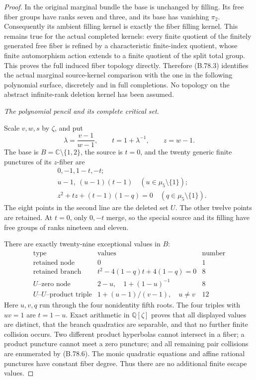 \begin{proof}
In the original marginal bundle the base is unchanged by filling.
Its free fiber groups have ranks seven and three, and its base has
vanishing \(\pi _2\). Consequently its ambient filling kernel is exactly
the fiber filling kernel. This remains true for the actual completed
kernels: every finite quotient of the finitely generated free fiber
is refined by a characteristic finite-index quotient, whose finite
automorphism action extends to a finite quotient of the split total
group. This proves the full induced fiber topology directly. Therefore
(B.78.3) identifies the actual marginal source-kernel comparison with
the one in the following polynomial surface, discretely and in full
completions. No topology on the abstract infinite-rank deletion kernel
has been assumed.

\emph{The polynomial pencil and its complete critical set.}\par
Scale \(v,w,s\) by \(\zeta\), and put
\[
 \lambda=\frac{v-1}{w-1},\qquad t=1+\lambda^{-1},\qquad z=w-1.
 \tag{B.78.4}
\]
The base is \(B=\mathbb C\setminus\{1,2\}\), the source is \(t=0\),
and the twenty generic finite punctures of its \(z\)-fiber are
\[
\begin{split}
 &0,-1,1-t,-t;\\
 &u-1,\ (u-1)(t-1)\quad(u\in\mu _5\setminus\{1\});\\
 &z^2+tz+(t-1)(1-q)=0
                   \quad(q\in\mu _5\setminus\{1\}).
\end{split}
 \tag{B.78.5}
\]
The eight points in the second line are the deleted set \(U\).
The other twelve points are retained. At \(t=0\), only \(0,-t\)
merge, so the special source and its filling have free groups of
ranks nineteen and eleven.

There are exactly twenty-nine exceptional values in \(B\):
\[
\begin{array}{c|c|c}
\text{type}&\text{values}&\text{number}\\\hline
\text{retained node}&0&1\\
\text{retained branch}&t^2-4(1-q)t+4(1-q)=0&8\\
U\text{--zero node}&2-u,\quad1+(1-u)^{-1}&8\\
U\text{--}U\text{--product triple}&
       1+(u-1)/(v-1),\quad u\ne v&12
\end{array}
 \tag{B.78.6}
\]
Here \(u,v,q\) run through the four nonidentity fifth roots. The four
triples with \(uv=1\) are \(t=1-u\). Exact arithmetic in
\(\mathbb Q[\zeta]\) proves that all displayed values are distinct,
that the branch quadratics are separable, and that no further finite
collision occurs. Two different product hyperbolas cannot intersect
in a fiber; a product puncture cannot meet a zero puncture; and all
remaining pair collisions are enumerated by (B.78.6). The monic
quadratic equations and affine rational punctures have constant fiber
degree. Thus there are no additional finite escape values.


\end{proof}
